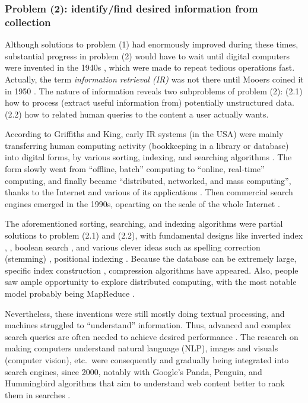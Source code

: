 \documentclass[final-report]{report-template}
\begin{document}
\subsubsection{Problem (2): identify/find desired information from collection}
Although solutions to problem (1) had enormously improved during these times,
substantial progress in problem (2) would have to wait until digital computers
were invented in the 1940s \cite{eniac.story}, which were made to repeat
tedious operations fast. Actually, the term \emph{information retrieval (IR)} was
not there until Mooers coined it in 1950 \cite{mooers.info.ret.term}.  The
nature of information reveals two subproblems of problem (2): (2.1) how to
process (extract useful information from) potentially unstructured data. (2.2)
how to related human queries to the content a user actually wants.

According to Griffiths and King, early IR systems (in the USA) were mainly
transferring human computing activity (bookkeeping in a library or database)
into digital forms, by various sorting, indexing, and searching algorithms
\cite{early.info.systems}. The form slowly went from ``offline, batch''
computing to ``online, real-time'' computing, and finally became ``distributed,
networked, and mass computing'', thanks to the Internet and various of its
applications \cite{early.info.systems, history.internet}. Then commercial
search engines emerged in the 1990s, opearting on the scale of the whole
Internet \cite{history.search.engines, history.internet.search.engines}.

The aforementioned sorting, searching, and indexing algorithms were partial
solutions to problem (2.1) and (2.2), with fundamental designs like inverted
index \cite[chap.~2]{intro.info.ret}, \cite[sect.~2]{inverted.files.search},
boolean search \cite[chap.~1]{intro.info.ret}, and various clever ideas such as
spelling correction (stemming) \cite[chap.~3.3]{intro.info.ret}, positional
indexing \cite[sect.~3]{inverted.files.search}. Because the database can be
extremely large, specific index construction \cite[chap.~4]{intro.info.ret},
\cite[sect.~5]{inverted.files.search} compression
\cite[chap.~5]{intro.info.ret} algorithms have appeared. Also, people saw ample
opportunity to explore distributed computing, with the most notable model
probably being MapReduce \cite{mapreduce}.

Nevertheless, these inventions were still mostly doing textual processing, and
machines struggled to ``understand'' information. Thus, advanced and complex
search queries are often needed to achieve desired performance
\cite{advanced.search.necessity.1, advanced.search.necessity.2}. The research
on making computers understand natural language (NLP), images and visuals
(computer vision), etc.\ were consequently and gradually being integrated into
search engines, since 2000, notably with Google's Panda, Penguin, and
Hummingbird algorithms that aim to understand web content better to rank them
in searches \cite{google.new.algos}.
\end{document}
